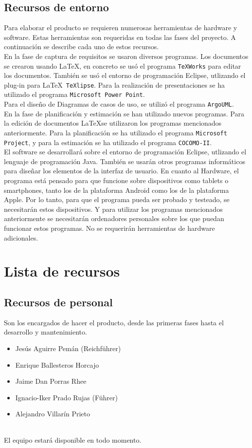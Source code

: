\documentclass[spanish,a4paper,12pt]{report}	%
\begin{document}
		\subsection{Recursos de entorno}
			Para elaborar el producto se requieren numerosas herramientas de hardware y
			software. Estas herramientas son requeridas en todas las fases del proyecto. 
			A continuación se describe cada uno de estos recursos.  \\
			En la fase de captura de requisitos se usaron diversos programas. Los documentos
			se crearon usando \LaTeX , en concreto se usó el programa \texttt{TeXWorks} para editar los documentos.
			También se usó el entorno de programación Eclipse, utlizando el plug-in para \LaTeX\  \texttt{TeXlipse}. 
			Para la realización de presentaciones se ha utilizado el programa \texttt{Microsoft Power Point}.\\
			Para el diseño de Diagramas de casos de uso, se utilizó el programa \texttt{ArgoUML}.\\
			En la fase de planificación y estimación se han utilizado nuevos programas. Para la edición de documentos
			\LaTeX se utilizaron los programas mencionados anteriormente. Para la planificación se ha utilizado el programa
			\texttt{Microsoft Project}, y para la estimación se ha utilizado el programa \texttt{COCOMO-II}.\\ 
			El software se desarrollará sobre el entorno de
			programación Eclipse, utlizando el lenguaje de programación Java. También se
			usarán otros programas informáticos para diseñar los elementos de la interfaz de
			usuario. En cuanto al Hardware, el programa está pensado para que funcione sobre dispositivos como
			tablets o smartphones, tanto los de la plataforma Android como los de la
			plataforma Apple. Por lo tanto, para que el programa pueda ser probado y
			testeado, se necesitarán estos dispositivos. Y para utilizar los programas mencionados anteriormente
			se necesitarán ordenadores personales sobre los que puedan funcionar estos programas.
			No se requerirán herramientas de
			hardware adicionales.


	\section{Lista de recursos}
		\subsection*{Recursos de personal}
			Son los encargados de hacer el producto, desde las primeras fases hasta el desarrollo y mantenimiento.\\
			\begin{itemize}
			  \item Jesús Aguirre Pemán (Reichführer)
			  \item Enrique Ballesteros Horcajo
			  \item Jaime Dan Porras Rhee
			  \item Ignacio-Iker Prado Rujas (Führer)
			  \item Alejandro Villarín Prieto
			\end{itemize}\ \\
			El equipo estará disponible en todo momento.
\end{document}
